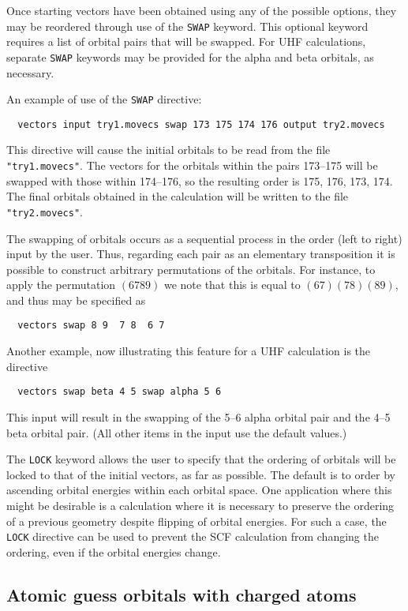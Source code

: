 Once starting vectors have been obtained using any of the possible
options, they may be reordered through use of the \verb+SWAP+ keyword.
This optional keyword requires a list of orbital pairs that will be
swapped.  For UHF calculations, separate \verb+SWAP+ keywords may be
provided for the alpha and beta orbitals, as necessary.

An example of use of the \verb+SWAP+ directive:
\begin{verbatim}
  vectors input try1.movecs swap 173 175 174 176 output try2.movecs
\end{verbatim}
This directive will cause the initial orbitals to be read from the
file \verb+"try1.movecs"+.  The vectors for the orbitals within the
pairs 173--175 will be swapped with those within 174--176, so the
resulting order is 175, 176, 173, 174.  The final orbitals obtained in
the calculation will be written to the file \verb+"try2.movecs"+.

The swapping of orbitals occurs as a sequential process in the order
(left to right) input by the user.  Thus, regarding each pair as an
elementary transposition it is possible to construct arbitrary
permutations of the orbitals.  For instance, to apply the permutation
$(6 7 8 9)$ we note that this is equal to $(6 7)(7 8)(8 9)$, and thus
may be specified as
\begin{verbatim}
  vectors swap 8 9  7 8  6 7
\end{verbatim}

Another example, now illustrating this feature for a UHF calculation
is the directive
\begin{verbatim}
  vectors swap beta 4 5 swap alpha 5 6
\end{verbatim}
This input will result in the swapping of the 5--6 alpha orbital pair and 
the 4--5 beta orbital pair.  (All other items in the input use the
default values.)

The \verb+LOCK+ keyword allows the user to specify that the ordering
of orbitals will be locked to that of the initial vectors, as far as
possible. The default is to order by ascending orbital energies within
each orbital space. One application where this might be desirable is a
calculation where it is necessary to preserve the ordering of a
previous geometry despite flipping of orbital energies.  For such a
case, the \verb+LOCK+ directive can be used to prevent the SCF
calculation from changing the ordering, even if the orbital energies
change.

\subsection{Atomic guess orbitals with charged atoms}


